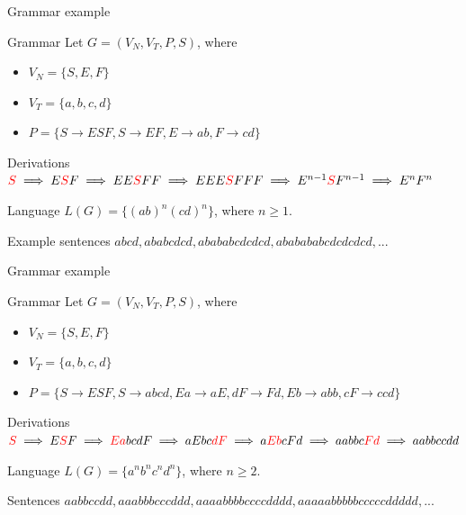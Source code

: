 \documentclass{beamer}
\begin{document}
\begin{frame}{Grammar example}
	\begin{block}{Grammar}
		Let $G = (V_N, V_T, P, S)$, where 
		\begin{itemize}
			\item $V_N = \{S, E, F\}$
			\item $V_T = \{a,b,c,d\}$
			\item $P = \{S \rightarrow ESF, S \rightarrow EF, E \rightarrow ab, F \rightarrow cd\}$
		\end{itemize}
	\end{block}
	
	\begin{block}{Derivations}
		\small$\textcolor{red}{S} \implies E\textcolor{red}{S}F \implies EE\textcolor{red}{S}FF \implies EEE\textcolor{red}{S}FFF \implies E^{n-1}\textcolor{red}{S}F^{n-1} \implies E^nF^n$
	\end{block}
	
	\begin{block}{Language}
		$L(G) = \{(ab)^n(cd)^n\}$, where $n\geq 1$.
	\end{block}
	
	\begin{exampleblock}{Example sentences}
		$abcd, ababcdcd, abababcdcdcd, ababababcdcdcdcd, ...$
	\end{exampleblock}
\end{frame}

\begin{frame}{Grammar example}
	\begin{block}{Grammar}
		Let $G = (V_N, V_T, P, S)$, where 
		\begin{itemize}
			\item \small$V_N = \{S, E, F\}$
			\item \small$V_T = \{a,b,c,d\}$
			\item \small$P = \{S \rightarrow ESF, S \rightarrow abcd, Ea \rightarrow aE, dF \rightarrow Fd, Eb \rightarrow abb, cF \rightarrow ccd\}$\normalsize
		\end{itemize}
	\end{block}
	\begin{block}{Derivations}
		\footnotesize$\textcolor{red}{S} \implies E\textcolor{red}{S}F \implies \textcolor{red}{Ea}bcdF \implies aEbc\textcolor{red}{dF} \implies a\textcolor{red}{Eb}cFd \implies aabbc\textcolor{red}{Fd} \implies aabbccdd$ 
	\end{block}
	
	\begin{block}{Language}
		$L(G) = \{a^nb^nc^nd^n\}$, where $n \geq 2$.
	\end{block}
	
	\begin{exampleblock}{Sentences}
		$aabbccdd, aaabbbcccddd, aaaabbbbccccdddd, aaaaabbbbbcccccddddd, ...$
	\end{exampleblock}
	
\end{frame}
\end{document}
